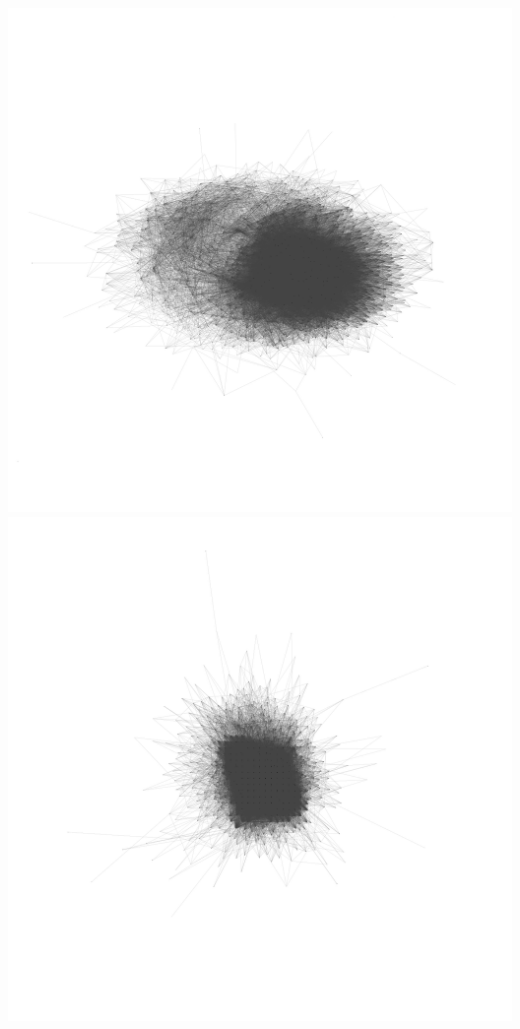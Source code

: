 \documentclass[12pt, a4paper]{article}
\begin{document}
\begin{multicols}{2}
  {\centering
  \includegraphics[width=\columnwidth]{src/youtube/hdg/comp/7_plot_kk}\\
  \label{fig:hdg_c5}}
  {\centering
  \includegraphics[width=\columnwidth]{src/youtube/hdg/comp/6_plot_ghopt}\\
  \label{fig:hdg_c6}}
\end{multicols}
\end{document}
